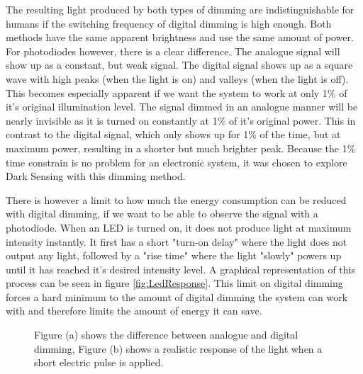 The resulting light produced by both types of dimming are indistinguishable for humans if the switching frequency of digital dimming is high enough. Both methods have the same apparent brightness and use the same amount of power. For photodiodes however, there is a clear difference. The analogue signal will show up as a constant, but weak signal. The digital signal shows up as a square wave with high peaks (when the light is on) and valleys (when the light is off). This becomes especially apparent if we want the system to work at only 1\% of it's original illumination level. The signal dimmed in an analogue manner will be nearly invisible as it is turned on constantly at 1\% of it's original power. This in contrast to the digital signal, which only shows up for 1\% of the time, but at maximum power, resulting in a shorter but much brighter peak. Because the 1\% time constrain is no problem for an electronic system, it was chosen to explore Dark Sensing with this dimming method.

There is however a limit to how much the energy consumption can be reduced with digital dimming, if we want to be able to observe the signal with a photodiode. When an LED is turned on, it does not produce light at maximum intensity instantly\cite{LED_on}. It first has a short "turn-on delay" where the light does not output any light, followed by a "rise time" where the light "slowly" powers up until it has reached it's desired intensity level. A graphical representation of this process can be seen in figure \ref{fig:LedResponse}. This limit on digital dimming forces a hard minimum to the amount of digital dimming the system can work with and therefore limits the amount of energy it can save.

\begin{figure}[]
	\caption{Figure (a) shows the difference between analogue and digital dimming, Figure (b) shows a realistic response of the light when a short electric pulse is applied\cite{LED_on}.\label{fig:LedOnTime}}
\end{figure}

